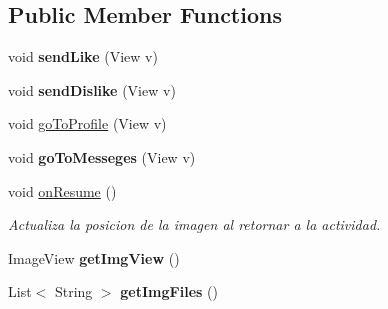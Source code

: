 \subsection*{Public Member Functions}
\begin{DoxyCompactItemize}
\item 
void {\bfseries send\+Like} (View v)\hypertarget{classcom_1_1example_1_1sebastian_1_1tindertp_1_1MatchingActivity_aaac2d32f3fa7f049c705f3ab41dce15f}{}\label{classcom_1_1example_1_1sebastian_1_1tindertp_1_1MatchingActivity_aaac2d32f3fa7f049c705f3ab41dce15f}

\item 
void {\bfseries send\+Dislike} (View v)\hypertarget{classcom_1_1example_1_1sebastian_1_1tindertp_1_1MatchingActivity_ab767385c590b24f38a900a8d3e654ba5}{}\label{classcom_1_1example_1_1sebastian_1_1tindertp_1_1MatchingActivity_ab767385c590b24f38a900a8d3e654ba5}

\item 
void \hyperlink{classcom_1_1example_1_1sebastian_1_1tindertp_1_1MatchingActivity_a165578fb0308f52996c88c0cc0707006}{go\+To\+Profile} (View v)
\item 
void {\bfseries go\+To\+Messeges} (View v)\hypertarget{classcom_1_1example_1_1sebastian_1_1tindertp_1_1MatchingActivity_a3fb08eda023bf9fe146209008d556d26}{}\label{classcom_1_1example_1_1sebastian_1_1tindertp_1_1MatchingActivity_a3fb08eda023bf9fe146209008d556d26}

\item 
void \hyperlink{classcom_1_1example_1_1sebastian_1_1tindertp_1_1MatchingActivity_a0333dc89868b7e867c1df75ec9d7717f}{on\+Resume} ()
\begin{DoxyCompactList}\small\item\em Actualiza la posicion de la imagen al retornar a la actividad. \end{DoxyCompactList}\item 
Image\+View {\bfseries get\+Img\+View} ()\hypertarget{classcom_1_1example_1_1sebastian_1_1tindertp_1_1MatchingActivity_a938baa2ab6824889728cfc617764afff}{}\label{classcom_1_1example_1_1sebastian_1_1tindertp_1_1MatchingActivity_a938baa2ab6824889728cfc617764afff}

\item 
List$<$ String $>$ {\bfseries get\+Img\+Files} ()\hypertarget{classcom_1_1example_1_1sebastian_1_1tindertp_1_1MatchingActivity_a00246ce41d7222a8fa5c7f5657e284d3}{}\label{classcom_1_1example_1_1sebastian_1_1tindertp_1_1MatchingActivity_a00246ce41d7222a8fa5c7f5657e284d3}


\end{DoxyCompactItemize}
